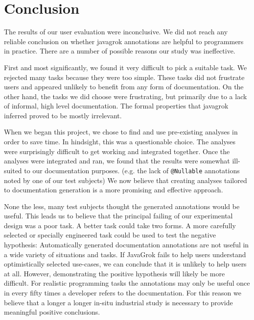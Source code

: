 \section{Conclusion}

The results of our user evaluation were inconclusive.  We did not reach any reliable conclusion on whether javagrok annotations are helpful to programmers in practice.  There are a number of possible reasons our study was ineffective.

First and most significantly, we found it very difficult to pick a suitable task.  We rejected many tasks because they were too simple.  These tasks did not frustrate users and appeared unlikely to benefit from any form of documentation.  On the other hand, the tasks we did choose were frustrating, but primarily due to a lack of informal, high level documentation.  The formal properties that javagrok inferred proved to be mostly irrelevant.

When we began this project, we chose to find and use pre-existing analyses in order to save time.  In hindsight, this was a questionable choice.  The analyses were surprisingly difficult to get working and integrated together.  Once the analyses were integrated and ran, we found that the results were somewhat ill-suited to our documentation purposes. (e.g. the lack of \texttt{@Nullable} annotations noted by one of our test subjects) We now believe that creating analyses tailored to documentation generation is a more promising and effective approach.

None the less, many test subjects thought the generated annotations would be useful.  This leads us to believe that the principal failing of our experimental design was a poor task.  A better task could take two forms.  A more carefully selected or specially engineered task could be used to test the negative hypothesis:  Automatically generated documentation annotations are not useful in a wide variety of situations and tasks.  If JavaGrok fails to help users understand optimistically selected use-cases, we can conclude that it is unlikely to help users at all.  However, demonstrating the positive hypothesis will likely be more difficult.  For realistic programming tasks the annotations may only be useful once in every fifty times a developer refers to the documentation.  For this reason we believe that a longer a longer in-situ industrial study is necessary to provide meaningful positive conclusions.

